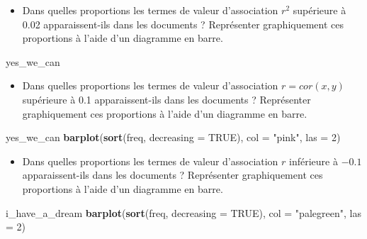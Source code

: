 \documentclass[]{article}
\newenvironment{Shaded}{\begin{snugshade}}{\end{snugshade}}
\newcommand{\KeywordTok}[1]{\textcolor[rgb]{0.13,0.29,0.53}{\textbf{#1}}}
\newcommand{\DataTypeTok}[1]{\textcolor[rgb]{0.13,0.29,0.53}{#1}}
\newcommand{\DecValTok}[1]{\textcolor[rgb]{0.00,0.00,0.81}{#1}}
\newcommand{\StringTok}[1]{\textcolor[rgb]{0.31,0.60,0.02}{#1}}
\newcommand{\OtherTok}[1]{\textcolor[rgb]{0.56,0.35,0.01}{#1}}
\newcommand{\NormalTok}[1]{#1}
\providecommand{\tightlist}{%
  \setlength{\itemsep}{0pt}\setlength{\parskip}{0pt}}
\begin{document}
\begin{itemize}
\tightlist
\item
  Dans quelles proportions les termes de valeur d'association \(r^2\)
  supérieure à 0.02 apparaissent-ils dans les documents ? Représenter
  graphiquement ces proportions à l'aide d'un diagramme en barre.
\end{itemize}

\begin{Shaded}
\begin{Highlighting}[]
\NormalTok{  yes_we_can}
\end{Highlighting}
\end{Shaded}

\begin{itemize}
\tightlist
\item
  Dans quelles proportions les termes de valeur d'association
  \(r = cor(x,y)\) supérieure à 0.1 apparaissent-ils dans les documents
  ? Représenter graphiquement ces proportions à l'aide d'un diagramme en
  barre.
\end{itemize}

\begin{Shaded}
\begin{Highlighting}[]
\NormalTok{  yes_we_can}
  \KeywordTok{barplot}\NormalTok{(}\KeywordTok{sort}\NormalTok{(freq, }\DataTypeTok{decreasing =} \OtherTok{TRUE}\NormalTok{), }\DataTypeTok{col =} \StringTok{"pink"}\NormalTok{, }\DataTypeTok{las =} \DecValTok{2}\NormalTok{)}
\end{Highlighting}
\end{Shaded}

\begin{itemize}
\tightlist
\item
  Dans quelles proportions les termes de valeur d'association \(r\)
  inférieure à \(-0.1\) apparaissent-ils dans les documents ?
  Représenter graphiquement ces proportions à l'aide d'un diagramme en
  barre.
\end{itemize}

\begin{Shaded}
\begin{Highlighting}[]
\NormalTok{  i_have_a_dream}
  \KeywordTok{barplot}\NormalTok{(}\KeywordTok{sort}\NormalTok{(freq, }\DataTypeTok{decreasing =} \OtherTok{TRUE}\NormalTok{), }\DataTypeTok{col =} \StringTok{"palegreen"}\NormalTok{, }\DataTypeTok{las =} \DecValTok{2}\NormalTok{)}
\end{Highlighting}
\end{Shaded}
\end{document}
